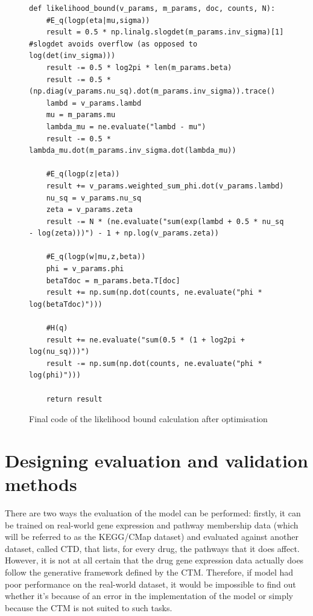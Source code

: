 \documentclass[12pt,a4paper,twoside,openright]{report}
\begin{document}
\begin{figure}
\begin{Verbatim}[fontsize=\scriptsize]
def likelihood_bound(v_params, m_params, doc, counts, N):
    #E_q(logp(eta|mu,sigma))
    result = 0.5 * np.linalg.slogdet(m_params.inv_sigma)[1] #slogdet avoids overflow (as opposed to log(det(inv_sigma)))
    result -= 0.5 * log2pi * len(m_params.beta)
    result -= 0.5 * (np.diag(v_params.nu_sq).dot(m_params.inv_sigma)).trace()
    lambd = v_params.lambd
    mu = m_params.mu
    lambda_mu = ne.evaluate("lambd - mu")
    result -= 0.5 * lambda_mu.dot(m_params.inv_sigma.dot(lambda_mu))
    
    #E_q(logp(z|eta))
    result += v_params.weighted_sum_phi.dot(v_params.lambd)
    nu_sq = v_params.nu_sq
    zeta = v_params.zeta
    result -= N * (ne.evaluate("sum(exp(lambd + 0.5 * nu_sq - log(zeta)))") - 1 + np.log(v_params.zeta))
    
    #E_q(logp(w|mu,z,beta))
    phi = v_params.phi
    betaTdoc = m_params.beta.T[doc]
    result += np.sum(np.dot(counts, ne.evaluate("phi * log(betaTdoc)")))
    
    #H(q)
    result += ne.evaluate("sum(0.5 * (1 + log2pi + log(nu_sq)))")
    result -= np.sum(np.dot(counts, ne.evaluate("phi * log(phi)")))
    
    return result
\end{Verbatim}
\caption{Final code of the likelihood bound calculation after optimisation}
\label{fig:code-after-optimisation}
\end{figure}

\section{Designing evaluation and validation methods}

There are two ways the evaluation of the model can be performed: firstly, it can be trained on real-world gene expression and pathway membership data (which will be referred to as the KEGG/CMap dataset) and evaluated against another dataset, called CTD, that lists, for every drug, the pathways that it does affect. However, it is not at all certain that the drug gene expression data actually does follow the generative framework defined by the CTM. Therefore, if model had poor performance on the real-world dataset, it would be impossible to find out whether it's because of an error in the implementation of the model or simply because the CTM is not suited to such tasks.
\end{document}
